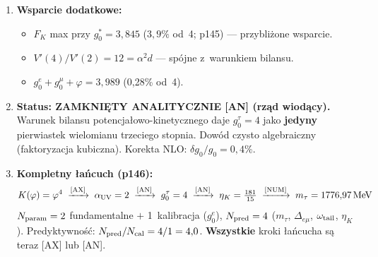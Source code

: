 \begin{enumerate}
    \textbf{Dowod algebraiczny:}
    Dla $V'(g) = g^2(1-g)$: stosunek upraszcza si\k{e} do
    $g_0(\sqrt{g_0}+1)$. R\'ownanie:
    \begin{equation}
      \boxed{t^3 + t^2 - 12 = 0,\quad t = \sqrt{g_0}}
      \qquad\Longrightarrow\qquad
      (t-2)(t^2+3t+6) = 0.
    \end{equation}
    Dyskryminant $t^2+3t+6$: $\Delta = 9 - 24 = -15 < 0$ (brak
    pierwiastk\'ow rzeczywistych).
    \textbf{Jedyny} pierwiastek rzeczywisty: $t = 2$,
    \begin{equation}
      \boxed{g_0^\tau = t^2 = 4.} \qquad\textbf{[AN]}
    \end{equation}
    R\'ownowa\.znie: $g_0 = 4$ to jedyna warto\'s\'c, dla kt\'orej
    $\sqrt{g_0} = g_0/2$ (punkt \'srodkowy $K$-przestrzeni = punkt
    \'srodkowy przestrzeni pola).

    Specyficzno\'s\'c: warunek daje $g_0 = 2\alpha$ \textbf{wy\l{}\k{a}cznie}
    dla $\alpha = 2$, $d = 3$, $n = 3$ (wyk\l{}adnik potencja\l{}u TGP).
    Pe\l{}na $\eta_K = 181/15$ daje $g_0 = 4{,}017$ (korekta $0{,}4\%$
    rz\k{e}du NLO).

  \item \textbf{Wsparcie dodatkowe:}
    \begin{itemize}[nosep]
      \item $F_K$ max przy $g_0^* = 3{,}845$ ($3{,}9\%$ od~4; p145) ---
            przybli\.zone wsparcie.
      \item $V'(4)/V'(2) = 12 = \alpha^2 d$ --- sp\'ojne z~warunkiem bilansu.
      \item $g_0^e + g_0^\mu + \varphi = 3{,}989$ (0{,}28\% od~4).
    \end{itemize}

  \item \textbf{Status: ZAMKNI\k{E}TY ANALITYCZNIE [AN] (rz\k{a}d wiod\k{a}cy).}
    Warunek bilansu potencja\l{}owo-kinetycznego daje $g_0^\tau = 4$
    jako \textbf{jedyny} pierwiastek wielomianu trzeciego stopnia.
    Dow\'od czysto algebraiczny (faktoryzacja kubiczna).
    Korekta NLO: $\delta g_0 / g_0 = 0{,}4\%$.

  \item \textbf{Kompletny \l{}a\'ncuch (p146):}
    \begin{equation}
      K(\varphi) = \varphi^4 \;\xrightarrow{\text{[AX]}}\;
      \alpha_{\rm UV} = 2 \;\xrightarrow{\text{[AN]}}\;
      g_0^\tau = 4 \;\xrightarrow{\text{[AN]}}\;
      \eta_K = \tfrac{181}{15} \;\xrightarrow{\text{[NUM]}}\;
      m_\tau = 1776{,}97\,\text{MeV}
    \end{equation}
    $N_{\rm param} = 2$ fundamentalne $+$ 1~kalibracja ($g_0^e$),
    $N_{\rm pred} = 4$ ($m_\tau$, $\Delta_{e\mu}$, $\omega_{\rm tail}$, $\eta_K$).
    Predyktywno\'s\'c: $N_{\rm pred}/N_{\rm cal} = 4/1 = 4{,}0$.
    \textbf{Wszystkie} kroki \l{}a\'ncucha s\k{a} teraz [AX] lub [AN].
\end{enumerate}

